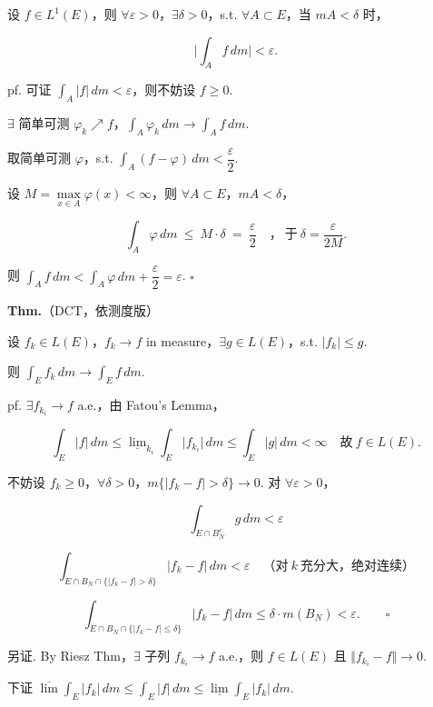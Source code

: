 \documentclass[11pt]{ctexart}
\theoremstyle{definition}
\begin{document}
设 $f \in L^1(E)$，则 $\forall \varepsilon > 0$，$\exists \delta > 0$，s.t. $\forall A \subset E$，当 $mA < \delta$ 时，

\[
\Big\vert \int_A f \, dm \Big\vert < \varepsilon.
\]

pf. 可证 $\int_A \vert f\vert \, dm < \varepsilon$，则不妨设 $f \geq 0$.

$\exists$ 简单可测 $\varphi_k \nearrow f$，$\displaystyle\int_A \varphi_k \, dm \to \int_A f \, dm$.

取简单可测 $\varphi$，s.t. $\displaystyle\int_A (f - \varphi) \, dm < \dfrac{\varepsilon}{2}$.

设 $M = \max\limits_{x \in A} \varphi(x) < \infty$，则 $\forall A \subset E$，$mA < \delta$，

\[
\int_A \varphi \, dm \ \leq\ M \cdot \delta \ =\ \frac{\varepsilon}{2} \quad ，\ \text{于}\ \delta = \frac{\varepsilon}{2M}.
\]

则 $\displaystyle\int_A f \, dm < \int_A \varphi \, dm + \dfrac{\varepsilon}{2} = \varepsilon$. $\square$

\textbf{Thm.}（DCT，依测度版）

设 $f_k \in L(E)$，$f_k \to f$ in measure，$\exists g \in L(E)$，s.t. $\vert f_k\vert \leq g$.

则 $\displaystyle\int_E f_k \, dm \to \int_E f \, dm$.

pf. $\exists f_{k_i} \to f$ a.e.，由 Fatou's Lemma，

\[
\int_E \vert f\vert \, dm \leq \underline{\lim}_{k_i} \int_E \vert f_{k_i}\vert \, dm \leq \int_E \vert g\vert \, dm < \infty \quad \text{故}\ f \in L(E).
\]

不妨设 $f_k \geq 0$，$\forall \delta > 0$，$m\{\vert f_k - f\vert > \delta\} \to 0$. 对 $\forall \varepsilon > 0$，

\[
\int_{E \cap B_N^c} g \, dm < \varepsilon
\]

\[
\int_{E \cap B_N \cap \{\vert f_k - f\vert > \delta\}} \vert f_k - f\vert \, dm < \varepsilon \quad \text{（对}\ k\ \text{充分大，绝对连续）}
\]

\[
\int_{E \cap B_N \cap \{\vert f_k - f\vert \leq \delta\}} \vert f_k - f\vert \, dm \leq \delta \cdot m(B_N) < \varepsilon. \qquad \square
\]

另证. By Riesz Thm，$\exists$ 子列 $f_{k_i} \to f$ a.e.，则 $f \in L(E)$ 且 $\Vert f_{k_i} - f\Vert \to 0$.

下证 $\overline{\lim} \int_E \vert f_k\vert \, dm \leq \int_E \vert f\vert \, dm \leq \underline{\lim} \int_E \vert f_k\vert \, dm$.
\end{document}
